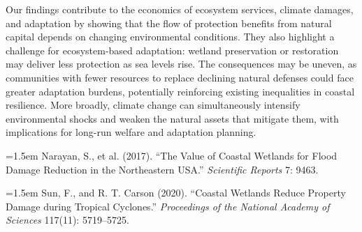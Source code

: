 \documentclass[12pt,a4paper]{article}
\begin{document}
Our findings contribute to the economics of ecosystem services, climate damages, and adaptation by showing that the flow of protection benefits from natural capital depends on changing environmental conditions. They also highlight a challenge for ecosystem-based adaptation: wetland preservation or restoration may deliver less protection as sea levels rise. The consequences may be uneven, as communities with fewer resources to replace declining natural defenses could face greater adaptation burdens, potentially reinforcing existing inequalities in coastal resilience. More broadly, climate change can simultaneously intensify environmental shocks and weaken the natural assets that mitigate them, with implications for long-run welfare and adaptation planning.

\vspace{0.75\baselineskip}
\par
\vspace{0.25em}
{\footnotesize
\setlength{\parindent}{0pt}
\setlength{\parskip}{0.35em}
\hangindent=1.5em
Narayan, S., et al. (2017). ``The Value of Coastal Wetlands for Flood Damage Reduction in the Northeastern USA.'' \textit{Scientific Reports} 7: 9463.\par
\hangindent=1.5em
Sun, F., and R. T. Carson (2020). ``Coastal Wetlands Reduce Property Damage during Tropical Cyclones.'' \textit{Proceedings of the National Academy of Sciences} 117(11): 5719--5725.\par
}
\end{document}
